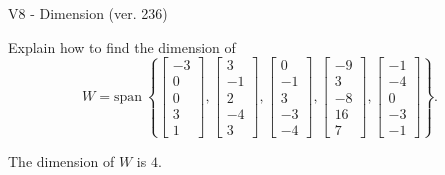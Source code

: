 \begin{exercise}
  \begin{exerciseTitle}V8 - Dimension (ver. 236)\end{exerciseTitle}
  \begin{exerciseStatement}
    Explain how to find the dimension of 
\[W=\mathrm{span}\ \left\{\left[\begin{array}{r}
-3 \\
0 \\
0 \\
3 \\
1
\end{array}\right] , \left[\begin{array}{r}
3 \\
-1 \\
2 \\
-4 \\
3
\end{array}\right] , \left[\begin{array}{r}
0 \\
-1 \\
3 \\
-3 \\
-4
\end{array}\right] , \left[\begin{array}{r}
-9 \\
3 \\
-8 \\
16 \\
7
\end{array}\right] , \left[\begin{array}{r}
-1 \\
-4 \\
0 \\
-3 \\
-1
\end{array}\right]\right\}.\]



  \end{exerciseStatement}
  \begin{exerciseAnswer}
   The dimension of \(W\) is  \(4\).
  


  \end{exerciseAnswer}
\end{exercise}
